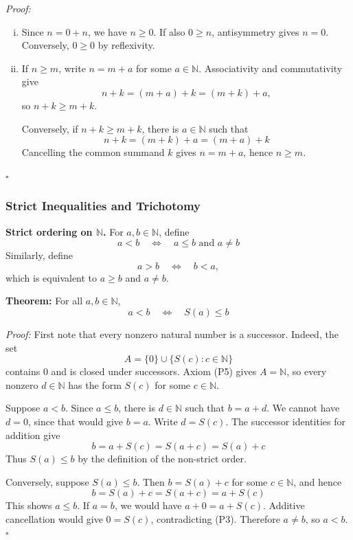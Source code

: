 \documentclass[a4paper,11pt,abstracton]{scrartcl}
\newcommand{\NN}{\mathbb{N}}
\theoremstyle{dotlessP}
\theoremstyle{dotlessS}
\theoremstyle{remark}
\theoremstyle{definition}
\begin{document}
\begin{claim_box}
\textit{Proof:}
\begin{enumerate}[(i)]
    \item Since $n=0+n$, we have $n\ge0$. If also $0\ge n$,
    antisymmetry gives $n=0$. Conversely, $0\ge0$ by reflexivity.

    \item If $n\ge m$, write $n=m+a$ for some $a\in\NN$.
    Associativity and commutativity give
    \[
        n+k=(m+a)+k=(m+k)+a,
    \]
    so $n+k\ge m+k$.

    Conversely, if $n+k\ge m+k$, there is $a\in\NN$ such that
    \[
        n+k=(m+k)+a=(m+a)+k
    \]
    Cancelling the common summand $k$ gives $n=m+a$, hence $n\ge m$.
\end{enumerate}
\hfill$\square$
\end{claim_box}


\subsubsection{Strict Inequalities and Trichotomy}

\begin{definition_box}
\textbf{Strict ordering on $\NN$.} For $a,b\in\NN$, define
\[
    a<b\quad\Longleftrightarrow\quad a\le b\text{ and }a\ne b
\]
Similarly, define
\[
    a>b\quad\Longleftrightarrow\quad b<a,
\]
which is equivalent to $a\ge b$ and $a\ne b$.
\end{definition_box}

\begin{problem_box}
\textbf{Theorem:}
For all $a,b\in\NN$,
\[
    a<b\quad\Longleftrightarrow\quad S(a)\le b
\]
\end{problem_box}

\begin{claim_box}
\textit{Proof:}
First note that every nonzero natural number is a successor. Indeed, the
set
\[
    A=\{0\}\cup\{S(c):c\in\NN\}
\]
contains $0$ and is closed under successors. Axiom (P5) gives $A=\NN$,
so every nonzero $d\in\NN$ has the form $S(c)$ for some $c\in\NN$.

Suppose $a<b$. Since $a\le b$, there is $d\in\NN$ such that $b=a+d$.
We cannot have $d=0$, since that would give $b=a$. Write $d=S(c)$.
The successor identities for addition give
\[
    b=a+S(c)=S(a+c)=S(a)+c
\]
Thus $S(a)\le b$ by the definition of the non-strict order.

Conversely, suppose $S(a)\le b$. Then $b=S(a)+c$ for some $c\in\NN$,
and hence
\[
    b=S(a)+c=S(a+c)=a+S(c)
\]
This shows $a\le b$. If $a=b$, we would have $a+0=a+S(c)$.
Additive cancellation would give $0=S(c)$, contradicting (P3).
Therefore $a\ne b$, so $a<b$.
\hfill$\square$
\end{claim_box}
\end{document}
